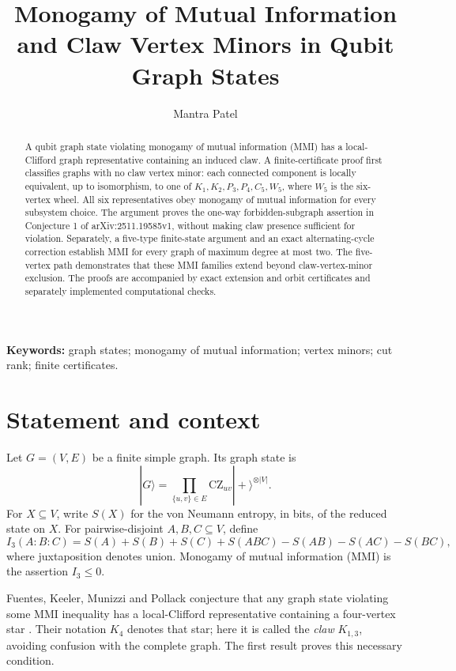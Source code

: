 \documentclass[11pt,letterpaper]{article}
\title{Monogamy of Mutual Information and Claw Vertex Minors in Qubit Graph States}
\author{Mantra Patel}
\date{}
\newcommand{\Ithree}{I_3}
\begin{document}
\maketitle
\begin{abstract}
A qubit graph state violating monogamy of mutual information (MMI) has a local-Clifford graph representative containing an induced claw. A finite-certificate proof first classifies graphs with no claw vertex minor: each connected component is locally equivalent, up to isomorphism, to one of $K_1,K_2,P_3,P_4,C_5,W_5$, where $W_5$ is the six-vertex wheel. All six representatives obey monogamy of mutual information for every subsystem choice. The argument proves the one-way forbidden-subgraph assertion in Conjecture 1 of arXiv:2511.19585v1, without making claw presence sufficient for violation. Separately, a five-type finite-state argument and an exact alternating-cycle correction establish MMI for every graph of maximum degree at most two. The five-vertex path demonstrates that these MMI families extend beyond claw-vertex-minor exclusion. The proofs are accompanied by exact extension and orbit certificates and separately implemented computational checks.
\end{abstract}
\noindent\textbf{Keywords:} graph states; monogamy of mutual information; vertex minors; cut rank; finite certificates.


\section{Statement and context}
Let $G=(V,E)$ be a finite simple graph. Its graph state is
\[
 |G\rangle=\prod_{\{u,v\}\in E}\mathrm{CZ}_{uv}|+\rangle^{\otimes |V|}.
\]
For $X\subseteq V$, write $S(X)$ for the von Neumann entropy, in bits, of the reduced state on $X$. For pairwise-disjoint $A,B,C\subseteq V$, define
\begin{equation}\label{eq:I3}
 \Ithree(A:B:C)=S(A)+S(B)+S(C)+S(ABC)-S(AB)-S(AC)-S(BC),
\end{equation}
where juxtaposition denotes union. Monogamy of mutual information (MMI) is the assertion $\Ithree\leq0$.

Fuentes, Keeler, Munizzi and Pollack conjecture that any graph state violating some MMI inequality has a local-Clifford representative containing a four-vertex star \cite[Conjecture~1, manuscript p.~30]{FKMP}. Their notation $K_4$ denotes that star; here it is called the \emph{claw} $K_{1,3}$, avoiding confusion with the complete graph. The first result proves this necessary condition.
\end{document}

